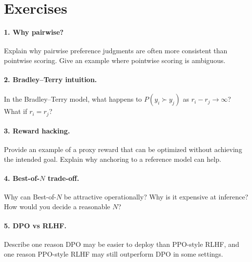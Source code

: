 \section{Exercises}
\paragraph{1. Why pairwise?}
Explain why pairwise preference judgments are often more consistent than pointwise scoring. Give an example where pointwise scoring is ambiguous.

\paragraph{2. Bradley--Terry intuition.}
In the Bradley--Terry model, what happens to \(P(y_i \succ y_j)\) as \(r_i - r_j \to \infty\)? What if \(r_i = r_j\)?

\paragraph{3. Reward hacking.}
Provide an example of a proxy reward that can be optimized without achieving the intended goal. Explain why anchoring to a reference model can help.

\paragraph{4. Best-of-\(N\) trade-off.}
Why can Best-of-\(N\) be attractive operationally? Why is it expensive at inference? How would you decide a reasonable \(N\)?

\paragraph{5. DPO vs RLHF.}
Describe one reason DPO may be easier to deploy than PPO-style RLHF, and one reason PPO-style RLHF may still outperform DPO in some settings.
